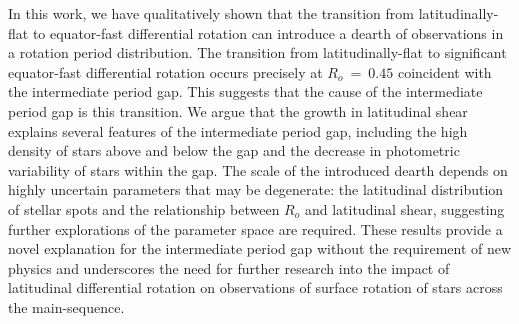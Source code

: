 In this work, we have qualitatively shown that the transition from latitudinally-flat to equator-fast differential rotation can introduce a dearth of observations in a rotation period distribution.
The transition from latitudinally-flat to significant equator-fast differential rotation occurs precisely at $R_o \ = \ 0.45$ coincident with the intermediate period gap.
This suggests that the cause of the intermediate period gap is this transition.
We argue that the growth in latitudinal shear explains several features of the intermediate period gap, including the high density of stars above and below the gap and the decrease in photometric variability of stars within the gap.
The scale of the introduced dearth depends on highly uncertain parameters that may be degenerate: the latitudinal distribution of stellar spots and the relationship between $R_o$ and latitudinal shear, suggesting further explorations of the parameter space are required.
These results provide a novel explanation for the intermediate period gap without the requirement of new physics and underscores the need for further research into the impact of latitudinal differential rotation on observations of surface rotation of stars across the main-sequence.